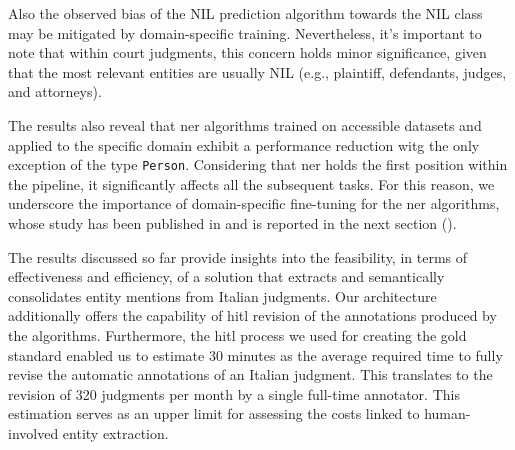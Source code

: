 Also the observed bias of the NIL prediction algorithm towards the NIL class may be mitigated by domain-specific training.
Nevertheless, it's important to note that within court judgments, this concern holds minor significance, given that the most relevant entities are usually NIL (e.g., plaintiff, defendants, judges, and attorneys). 

The results also reveal that \ac{ner} algorithms trained on accessible datasets and applied to the specific domain exhibit a performance reduction witg the only exception of the type \texttt{Person}. Considering that \ac{ner} holds the first position within the pipeline, it significantly affects all the subsequent tasks. For this reason, we underscore the importance of domain-specific fine-tuning for the \ac{ner} algorithms, whose study has been published in \textcite{aixia_2023} and is reported in the next section ().


The results discussed so far provide insights into the feasibility, in terms of effectiveness and efficiency, of a solution that extracts and semantically consolidates entity mentions from Italian judgments. Our architecture additionally offers the capability of \acl{hitl} revision of the annotations produced by the algorithms.
Furthermore, the \ac{hitl} process we used for creating the gold standard enabled us to estimate 30 minutes as the average required time to fully revise the automatic annotations of an Italian judgment. This translates to the revision of 320 judgments per month by a single full-time annotator. This estimation serves as an upper limit for assessing the costs linked to human-involved entity extraction.

